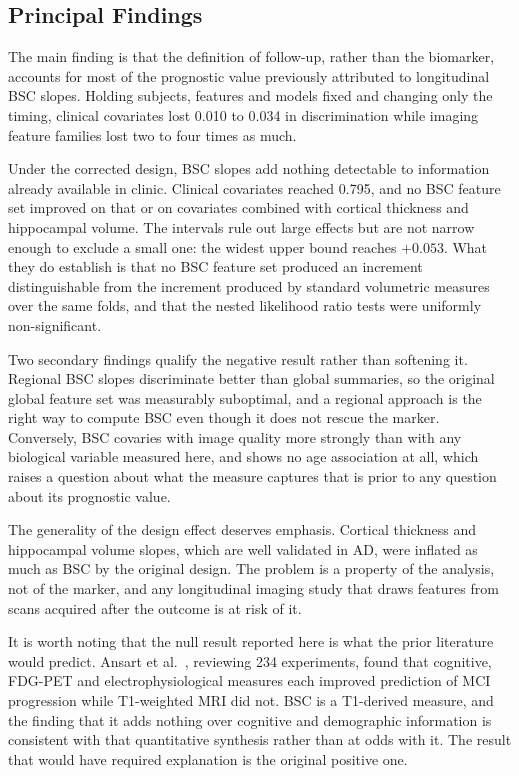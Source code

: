 \documentclass[blue]{ludusofficial}  %
\begin{document}
\subsection{Principal Findings}

The main finding is that the definition of follow-up, rather than the biomarker, accounts for most of the prognostic value previously attributed to longitudinal BSC slopes. Holding subjects, features and models fixed and changing only the timing, clinical covariates lost 0.010 to 0.034 in discrimination while imaging feature families lost two to four times as much.

Under the corrected design, BSC slopes add nothing detectable to information already available in clinic. Clinical covariates reached 0.795, and no BSC feature set improved on that or on covariates combined with cortical thickness and hippocampal volume. The intervals rule out large effects but are not narrow enough to exclude a small one: the widest upper bound reaches $+0.053$. What they do establish is that no BSC feature set produced an increment distinguishable from the increment produced by standard volumetric measures over the same folds, and that the nested likelihood ratio tests were uniformly non-significant.

Two secondary findings qualify the negative result rather than softening it. Regional BSC slopes discriminate better than global summaries, so the original global feature set was measurably suboptimal, and a regional approach is the right way to compute BSC even though it does not rescue the marker. Conversely, BSC covaries with image quality more strongly than with any biological variable measured here, and shows no age association at all, which raises a question about what the measure captures that is prior to any question about its prognostic value.

The generality of the design effect deserves emphasis. Cortical thickness and hippocampal volume slopes, which are well validated in AD, were inflated as much as BSC by the original design. The problem is a property of the analysis, not of the marker, and any longitudinal imaging study that draws features from scans acquired after the outcome is at risk of it.

It is worth noting that the null result reported here is what the prior literature would predict. Ansart et al.~\cite{ansart2021predicting}, reviewing 234 experiments, found that cognitive, FDG-PET and electrophysiological measures each improved prediction of MCI progression while T1-weighted MRI did not. BSC is a T1-derived measure, and the finding that it adds nothing over cognitive and demographic information is consistent with that quantitative synthesis rather than at odds with it. The result that would have required explanation is the original positive one.
\end{document}
